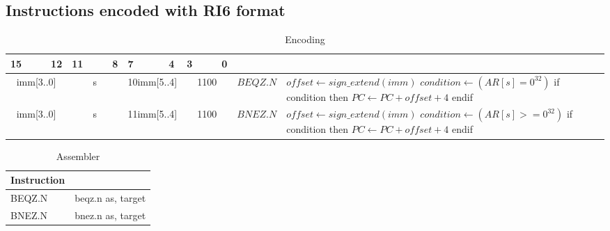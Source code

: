 \subsection{Instructions encoded with RI6 format}
\begin{smalltables}
\begin{longtable}{llllllllllllllll  p{1cm}  p{7cm} | }
	\caption{Encoding\label{long}}\\
	15 & & & 12 & 11 & & & 8 & 7 & & & 4 & 3 & & & 0 & & \multicolumn{1}{c}{}\\
	\hline
	\endhead
	\multicolumn{4}{|c|}{imm[3..0]} & \multicolumn{4}{c|}{s} & \multicolumn{4}{c|}{10imm[5..4]} & \multicolumn{4}{c|}{1100} & \multicolumn{1}{c|}{$BEQZ.N$} & $offset \leftarrow sign\_extend(imm)$ \newline $condition \leftarrow (AR[s] = 0^{32})$ \newline if condition then \newline $PC \leftarrow PC + offset + 4$ \newline endif \\ \hline
	\multicolumn{4}{|c|}{imm[3..0]} & \multicolumn{4}{c|}{s} & \multicolumn{4}{c|}{11imm[5..4]} & \multicolumn{4}{c|}{1100} & \multicolumn{1}{c|}{$BNEZ.N$} & $offset \leftarrow sign\_extend(imm)$ \newline $condition \leftarrow (AR[s] >= 0^{32})$ \newline if condition then \newline $PC \leftarrow PC + offset + 4$ \newline endif \\ \hline
\end{longtable}

\begin{longtable}{|p{5cm}|p{5cm}|}
	\caption{Assembler\label{long}}\\
	\hline
	Instruction & \\
	\hline
	BEQZ.N & beqz.n as, target\\ \hline
	BNEZ.N & bnez.n as, target\\ \hline
\end{longtable}
\end{smalltables}

